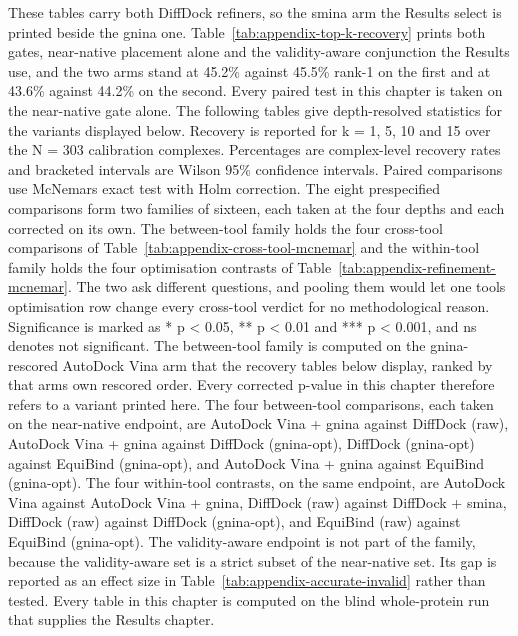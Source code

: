 These tables carry both DiffDock refiners, so the smina arm the Results select is printed beside the gnina one. Table~\ref{tab:appendix-top-k-recovery} prints both gates, near-native placement alone and the validity-aware conjunction the Results use, and the two arms stand at 45.2\% against 45.5\% rank-1 on the first and at 43.6\% against 44.2\% on the second. Every paired test in this chapter is taken on the near-native gate alone. The following tables give depth-resolved statistics for the variants displayed below. Recovery is reported for k = 1, 5, 10 and 15 over the N = 303 calibration complexes. Percentages are complex-level recovery rates and bracketed intervals are Wilson 95\% confidence intervals. Paired comparisons use McNemar\textquotesingle s exact test with Holm correction. The eight prespecified comparisons form two families of sixteen, each taken at the four depths and each corrected on its own. The between-tool family holds the four cross-tool comparisons of Table~\ref{tab:appendix-cross-tool-mcnemar} and the within-tool family holds the four optimisation contrasts of Table~\ref{tab:appendix-refinement-mcnemar}. The two ask different questions, and pooling them would let one tool\textquotesingle s optimisation row change every cross-tool verdict for no methodological reason. Significance is marked as * p \textless{} 0.05, ** p \textless{} 0.01 and *** p \textless{} 0.001, and ns denotes not significant. The between-tool family is computed on the gnina-rescored AutoDock Vina arm that the recovery tables below display, ranked by that arm\textquotesingle s own rescored order. Every corrected p-value in this chapter therefore refers to a variant printed here. The four between-tool comparisons, each taken on the near-native endpoint, are AutoDock Vina + gnina against DiffDock (raw), AutoDock Vina + gnina against DiffDock (gnina-opt), DiffDock (gnina-opt) against EquiBind (gnina-opt), and AutoDock Vina + gnina against EquiBind (gnina-opt). The four within-tool contrasts, on the same endpoint, are AutoDock Vina against AutoDock Vina + gnina, DiffDock (raw) against DiffDock + smina, DiffDock (raw) against DiffDock (gnina-opt), and EquiBind (raw) against EquiBind (gnina-opt). The validity-aware endpoint is not part of the family, because the validity-aware set is a strict subset of the near-native set. Its gap is reported as an effect size in Table~\ref{tab:appendix-accurate-invalid} rather than tested. Every table in this chapter is computed on the blind whole-protein run that supplies the Results chapter.

